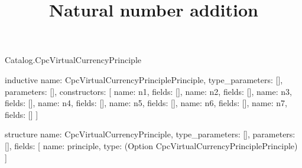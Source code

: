 \begin{lexlean}{Catalog.CpcVirtualCurrencyPrinciple}
\title{Natural number addition}
\begin{semanticmodule}
inductive{
  name: CpcVirtualCurrencyPrinciplePrinciple,
  type_parameters: [],
  parameters: [],
  constructors: [
    {name: n1, fields: []},
    {name: n2, fields: []},
    {name: n3, fields: []},
    {name: n4, fields: []},
    {name: n5, fields: []},
    {name: n6, fields: []},
    {name: n7, fields: []}
  ]
}

structure{
  name: CpcVirtualCurrencyPrinciple,
  type_parameters: [],
  parameters: [],
  fields: [
    {name: principle, type: (Option CpcVirtualCurrencyPrinciplePrinciple)}
  ]
}
\end{semanticmodule}
\end{lexlean}
